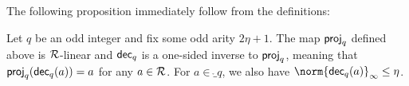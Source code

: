 %
The following proposition immediately follow from the definitions:
\begin{proposition}\label{prop:projanddecomp}
Let $q$ be an odd integer and fix some odd arity $2\eta+1$. The map $\mathsf{proj}_q$ defined above is $\mathcal{R}$-linear and $\mathsf{dec}_q$ is a one-sided inverse to $\mathsf{proj}_q$, meaning that $\mathsf{proj}_q(\mathsf{dec}_q(a))= a$ for any $a\in\mathcal{R}$.
For $a\in\ring_q$, we also have $\norm{\decomp_q(a)}_{\infty} \leq \eta$.
\end{proposition}

%
%   
% 
